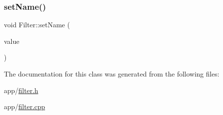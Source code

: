 \hypertarget{class_filter_ac6055d4347dd37c6f25c6c0290c50267}{}\label{class_filter_ac6055d4347dd37c6f25c6c0290c50267} 
\subsubsection{\texorpdfstring{set\+Name()}{setName()}}
{\footnotesize\ttfamily void Filter\+::set\+Name (\begin{DoxyParamCaption}\item[{const Q\+String \&}]{value }\end{DoxyParamCaption})}



The documentation for this class was generated from the following files\+:\begin{DoxyCompactItemize}
\item 
app/\hyperlink{filter_8h}{filter.\+h}\item 
app/\hyperlink{filter_8cpp}{filter.\+cpp}\end{DoxyCompactItemize}
